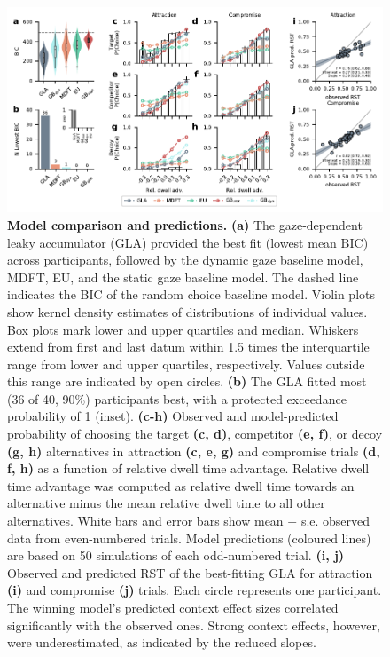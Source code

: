 \documentclass[11pt, a4paper]{article}
\begin{document}
\begin{figure}[bt!]
\begin{centering}
\includegraphics[scale=1]{../figures/3-model-comparison.pdf}
\caption{\textbf{Model comparison and predictions.} \textbf{(a)} The gaze-dependent leaky accumulator (GLA) provided the best fit (lowest mean BIC) across participants, followed by the dynamic gaze baseline model, MDFT, EU, and the static gaze baseline model. The dashed line indicates the BIC of the random choice baseline model. Violin plots show kernel density estimates of distributions of individual values. Box plots mark lower and upper quartiles and median. Whiskers extend from first and last datum within 1.5 times the interquartile range from lower and upper quartiles, respectively. Values outside this range are indicated by open circles. \textbf{(b)} The GLA fitted most (36 of 40, 90\%) participants best, with a protected exceedance probability of 1 (inset). \textbf{(c-h)} Observed and model-predicted probability of choosing the target \textbf{(c, d)}, competitor \textbf{(e, f)}, or decoy \textbf{(g, h)} alternatives in attraction \textbf{(c, e, g)} and compromise trials \textbf{(d, f, h)} as a function of relative dwell time advantage. Relative dwell time advantage was computed as relative dwell time towards an alternative minus the mean relative dwell time to all other alternatives. White bars and error bars show mean $\pm$ s.e. observed data from even-numbered trials. Model predictions (coloured lines) are based on 50 simulations of each odd-numbered trial. \textbf{(i, j)} Observed and predicted RST of the best-fitting GLA for attraction \textbf{(i)} and compromise \textbf{(j)} trials. Each circle represents one participant. The winning model’s predicted context effect sizes correlated significantly with the observed ones. Strong context effects, however, were underestimated, as indicated by the reduced slopes.}
\label{fig:modelcomparison}
\end{centering}
\end{figure}
\end{document}
